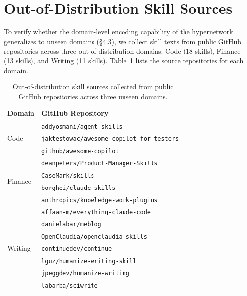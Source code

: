 \section{Out-of-Distribution Skill Sources}
\label{app:ood_skill}

To verify whether the domain-level encoding capability of the hypernetwork generalizes to unseen domains (\S4.3), we collect skill texts from public GitHub repositories across three out-of-distribution domains: Code (18 skills), Finance (13 skills), and Writing (11 skills). Table~\ref{tab:ood_sources} lists the source repositories for each domain.

\begin{table}[h]
\centering
\small
\caption{Out-of-distribution skill sources collected from public GitHub repositories across three unseen domains.}
\begin{tabular}{ll}
\toprule
\textbf{Domain} & \textbf{GitHub Repository} \\
\midrule
\multirow{3}{*}{Code}
  & \texttt{addyosmani/agent-skills} \\
  & \texttt{jaktestowac/awesome-copilot-for-testers} \\
  & \texttt{github/awesome-copilot} \\
\midrule
\multirow{4}{*}{Finance}
  & \texttt{deanpeters/Product-Manager-Skills} \\
  & \texttt{CaseMark/skills} \\
  & \texttt{borghei/claude-skills} \\
  & \texttt{anthropics/knowledge-work-plugins} \\
\midrule
\multirow{7}{*}{Writing}
  & \texttt{affaan-m/everything-claude-code} \\
  & \texttt{danielabar/meblog} \\
  & \texttt{OpenClaudia/openclaudia-skills} \\
  & \texttt{continuedev/continue} \\
  & \texttt{lguz/humanize-writing-skill} \\
  & \texttt{jpeggdev/humanize-writing} \\
  & \texttt{labarba/sciwrite} \\
\bottomrule
\end{tabular}
\label{tab:ood_sources}
\end{table}